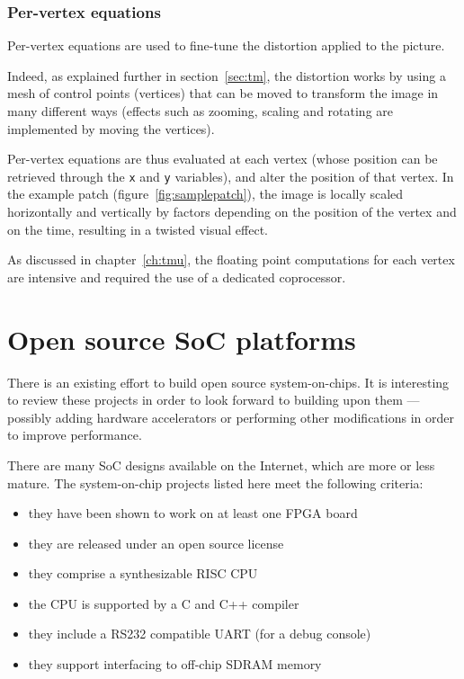 \documentclass[a4paper,11pt]{kthesis}
\begin{document}
\subsubsection{Per-vertex equations}
Per-vertex equations are used to fine-tune the distortion applied to the picture.

Indeed, as explained further in section~\ref{sec:tm}, the distortion works by using a mesh of control points (vertices) that can be moved to transform the image in many different ways (effects such as zooming, scaling and rotating are implemented by moving the vertices).

Per-vertex equations are thus evaluated at each vertex (whose position can be retrieved through the \verb!x! and \verb!y! variables), and alter the position of that vertex. In the example patch (figure~\ref{fig:samplepatch}), the image is locally scaled horizontally and vertically by factors depending on the position of the vertex and on the time, resulting in a twisted visual effect.

As discussed in chapter~\ref{ch:tmu}, the floating point computations for each vertex are intensive and required the use of a dedicated coprocessor.

\section{Open source SoC platforms}
There is an existing effort to build open source system-on-chips. It is interesting to review these projects in order to look forward to building upon them --- possibly adding hardware accelerators or performing other modifications in order to improve performance.

There are many SoC designs available on the Internet, which are more or less mature. The system-on-chip projects listed here meet the following criteria:
\begin{itemize}
\item they have been shown to work on at least one FPGA board
\item they are released under an open source license
\item they comprise a synthesizable RISC CPU
\item the CPU is supported by a C and C++ compiler
\item they include a RS232 compatible UART (for a debug console)
\item they support interfacing to off-chip SDRAM memory
\end{itemize}
\end{document}
